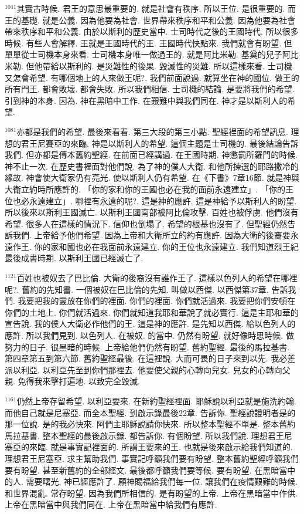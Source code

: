 \documentclass{book}
\begin{document}
$^{1041}$其實古時候.
君王的意思最重要的.
就是社會有秩序.
所以王位.
是很重要的.
而王的基礎.
就是公義.
因為他要為社會.
世界帶來秩序和平和公義.
因為他要為社會帶來秩序和平和公義.
由於以斯利的歷史當中.
士司時代之後的王國時代.
所以很多時候.
有些人會解釋.
王就是王國時代的王.
王國時代快點來.
我們就會有盼望.
但單單從士司機本身來看.
士司機本身唯一做過王的.
就是阿比米勒.
基奠的兒子阿比米勒.
但他帶給以斯利的.
是災難性的後果.
毀滅性的災難.
所以這樣來看.
士司機又怎會希望.
有哪個地上的人來做王呢?.
我們前面說過.
就算坐在神的國位.
做王的所有門王.
都會敗壞.
都會失敗.
所以我們相信.
士司機的結論.
是要將我們的希望.
引到神的本身.
因為.
神在黑暗中工作.
在艱難中與我們同在.
神才是以斯利人的希望.

$^{1081}$亦都是我們的希望.
最後來看看.
第三大段的第三小點.
聖經裡面的希望訊息.
理想的君王尼賽亞的來臨.
神是以斯利人的希望.
這個主題是士司機的.
最後結論告訴我們.
但亦都是傳本舊約聖經.
在前面已經講過.
在王國時期.
神懲罰所羅門的時候.
神不止一次.
在歷史書裡面對他們說.
為了神的僕人大衛.
和他所揀選的耶路撒冷的緣故.
神會使大衛家仍有亮光.
使以斯利人仍有希望.
在《下書》7章16節.
就是神與大衛立約時所應許的.
「你的家和你的王國也必在我的面前永遠建立」.
「你的王位也必永遠建立」.
哪裡有永遠的呢?.
這是神的應許.
這是神給予以斯利人的盼望.
所以後來以斯利王國滅亡.
以斯利王國南部被阿比倫攻擊.
百姓也被俘虜.
他們沒有希望.
很多人在這樣的情況下.
信仰也倒塌了.
希望的根基也沒有了.
但聖經仍然告訴我們.
上帝給予他們希望.
因為上帝和大衛所立的約有應許.
因為大衛的後裔要永遠作王.
你的家和國也必在我面前永遠建立.
你的王位也永遠建立.
我們知道烈王紀最後成書時期.
以斯利王國已經滅亡了.

$^{1121}$百姓也被奴去了巴比倫.
大衛的後裔沒有誰作王了.
這樣以色列人的希望在哪裡呢?.
舊約的先知書.
一個被奴在巴比倫的先知.
叫做以西傑.
以西傑第37章.
告訴我們.
我要把我的靈放在你們的裡面.
你們的裡面.
你們就活過來.
我要把你們安頓在你們的土地上.
你們就活過來.
你們就知道我耶和華說了就必實行.
這是主耶和華的宣告說.
我的僕人大衛必作他們的王.
這是神的應許.
是先知以西傑.
給以色列人的應許.
所以我們見到.
以色列人.
在被奴.
的當中.
仍然有盼望.
就好像時思時候.
做努力的日子.
很黑暗的時候.
上帝給他們仍然有盼望.
舊約聖經.
最後的馬拉基書.
第四章第五到第六節.
舊約聖經最後.
在這裡說.
大而可畏的日子來到以先.
我必差派以利亞.
以利亞先至到你們那裡去.
他要使父親的心轉向兒女.
兒女的心轉向父親.
免得我來擊打遍地.
以致完全毀滅.

$^{1161}$仍然上帝存留希望.
以利亞要來.
在新約聖經裡面.
耶穌說以利亞就是施洗約翰.
而他自己就是尼塞亞.
而全本聖經.
到啟示錄最後22章.
告訴你.
聖經說證明者是的那一位說.
是的我必快來.
阿們主耶穌說請你快來.
所以整本聖經不單是.
整本舊約馬拉基書.
整本聖經的最後啟示錄.
都告訴你.
有個盼望.
所以我們說.
理想君王尼塞亞的來臨.
就是事實記裡面的.
所謂王要來的王.
也就是後來啟示給我們知道的.
理想君王尼塞亞.
求主幫助我們.
事實記呼籲我們要有盼望.
整本舊約聖經呼籲我們要有盼望.
甚至新舊約的全部經文.
最後都呼籲我們要等候.
要有盼望.
在黑暗當中的人.
需要曙光.
神已經應許了.
願神賜福給我們每一位.
讓我們在疫情艱難的時候.
和世界混亂.
常存盼望.
因為我們所相信的.
是有盼望的上帝.
上帝在黑暗當中作供.
上帝在黑暗當中與我們同在.
上帝在黑暗當中給我們有應許.
\end{document}
